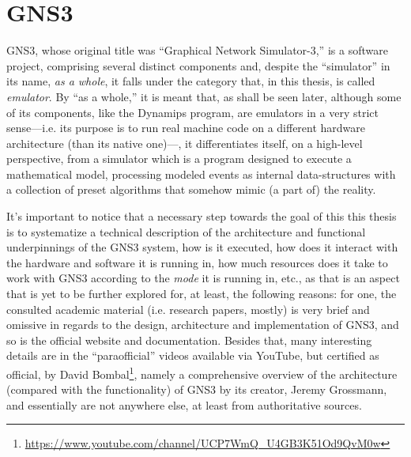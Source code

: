 
\chapter{GNS3}
\label{ch:gns3}

GNS3, whose original title was ``Graphical Network Simulator-3,'' is a software project, comprising several distinct components and, despite the ``simulator'' in its name, \emph{as a whole}, it falls under the category that, in this thesis, is called \emph{emulator}. %
By ``as a whole,'' it is meant that, as shall be seen later, although some of its components, like the Dynamips program, are emulators in a very strict sense---i.e. its purpose is to run real machine code on a different hardware architecture (than its native one)---, it differentiates itself, on a high-level perspective, from a simulator which is a program designed to execute a mathematical model, processing modeled events as internal data-structures with a collection of preset algorithms that somehow mimic (a part of) the reality.

It's important to notice that a necessary step towards the goal of this this thesis is to systematize a technical description of the architecture and functional underpinnings of the GNS3 system, how is it executed, how does it interact with the hardware and software it is running in, how much resources does it take to work with GNS3 according to the \emph{mode} it is running in, etc., as that is an aspect that is yet to be further explored for, at least, the following reasons:  %
for one, the consulted academic material (i.e. research papers, mostly) is very brief and omissive in regards to the design, architecture and implementation of GNS3, and so is the official website and documentation. Besides that, many interesting details are in the ``paraofficial'' videos available via YouTube, but certified as official, by David Bombal\footnote{\url{https://www.youtube.com/channel/UCP7WmQ_U4GB3K51Od9QvM0w}}, namely a comprehensive overview of the architecture (compared with the functionality) of GNS3 by its creator, Jeremy Grossmann, and essentially are not anywhere else, at least from authoritative sources. %


